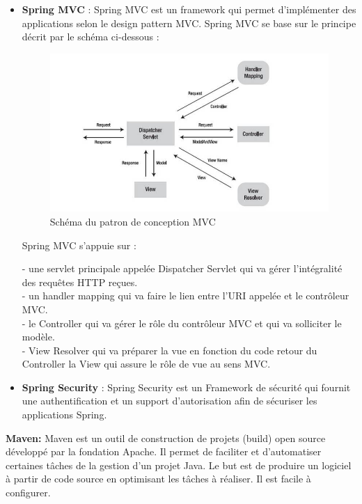 \documentclass[12pt]{article}
\begin{document}
\begin{itemize}
	\item \textbf{Spring MVC} : Spring MVC est un framework qui permet d’implémenter des applications selon le design pattern MVC. Spring MVC se base sur le principe décrit par le schéma ci-dessous :\newline
	

\begin{figure}[H]
	\centering
 		\includegraphics[width=1\textwidth]{diagrammes/mvc2.jpg} 
  		\caption{Schéma du patron de conception MVC}
	\end{figure}
	
	Spring MVC s'appuie sur :

    - une servlet principale appelée Dispatcher Servlet qui va gérer l'intégralité 			  des requêtes HTTP reçues.\\
    - un handler mapping qui va faire le lien entre l'URI appelée et le contrôleur    	  MVC.\\
    - le Controller qui va gérer le rôle du contrôleur MVC et qui va solliciter le 			  modèle.\\
    - View Resolver qui va préparer la vue en fonction du code retour du Controller
      la View qui assure le rôle de vue au sens MVC.

	
	\item \textbf{Spring Security }: Spring Security est un Framework de sécurité  qui fournit une authentification et un support d’autorisation afin de sécuriser les applications Spring. \newline
\end{itemize} 

\textbf{Maven:} Maven est un outil de construction de projets (build) open source développé par la fondation Apache. Il permet de faciliter et d'automatiser certaines tâches de la gestion d'un projet Java. Le but est de produire un logiciel à partir de code source en optimisant les tâches à réaliser. Il est facile à configurer.\newline
\end{document}
